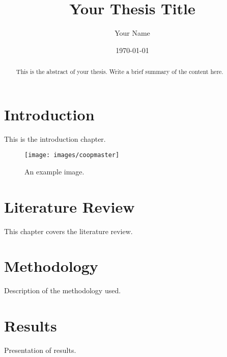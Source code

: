 \documentclass[12pt, a4paper]{report}
\begin{document}
\title{Your Thesis Title}
\author{Your Name}
\date{\today}
\maketitle

\begin{abstract}
  This is the abstract of your thesis. Write a brief summary of the content here.
\end{abstract}

\tableofcontents

\printindex

\chapter{Introduction}
\label{chap:introduction}
This is the introduction chapter.

\begin{figure}[h!]
  \centering
  \texttt{[image: images/coopmaster]}
  \caption{An example image.}
  \label{fig:example}
\end{figure}

\chapter{Literature Review}
\label{chap:literature}
This chapter covers the literature review.


\chapter{Methodology}
\label{chap:methodology}
Description of the methodology used.

\chapter{Results}
\label{chap:results}
Presentation of results.


\end{document}
